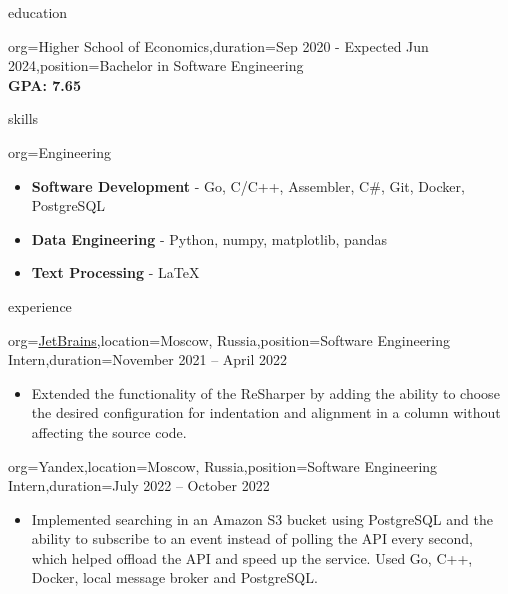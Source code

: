 \documentclass{resume}
\begin{document}
\makeheader

\begin{ResumeSection}{education}
    \begin{ResumeSubsection}{org={Higher School of Economics},duration={Sep 2020 - Expected Jun 2024},position={Bachelor in Software Engineering}}
        \\\bf GPA: 7.65 
    \end{ResumeSubsection}
\end{ResumeSection}


\begin{ResumeSection}{skills}
    \newcommand{\skill}[2]{\textbf{#1} - #2}
    \begin{ResumeSubsection}{org=Engineering}
        \begin{itemize}
            \item \skill{Software Development}{Go, C/C++, Assembler, C#, Git, Docker, PostgreSQL}
            \item \skill{Data Engineering}{Python, numpy, matplotlib, pandas}
            \item \skill{Text Processing}{LaTeX}
        \end{itemize}
    \end{ResumeSubsection}
\end{ResumeSection}

\begin{ResumeSection}{experience}
    \begin{ResumeSubsection}{org=\href{https://www.jetbrains.com/}{JetBrains},location={Moscow, Russia},position={Software Engineering Intern},duration=November 2021 – April 2022}
        \begin{itemize}
            \item {
                Extended the functionality of the ReSharper by adding the ability to choose the desired configuration for indentation and alignment in a column without affecting the source code.
            }
        \end{itemize}
    \end{ResumeSubsection}

    \begin{ResumeSubsection}{org=Yandex,location={Moscow, Russia},position={Software Engineering Intern},duration=July 2022 – October 2022}
        \begin{itemize}
            \item {
                Implemented searching in an Amazon S3 bucket using PostgreSQL and the ability to subscribe to an event instead of polling the API every second, which helped offload the API and speed up the service. Used Go, C++, Docker, local message broker and PostgreSQL.
            }
        \end{itemize}
    \end{ResumeSubsection}
\end{ResumeSection}
\end{document}
